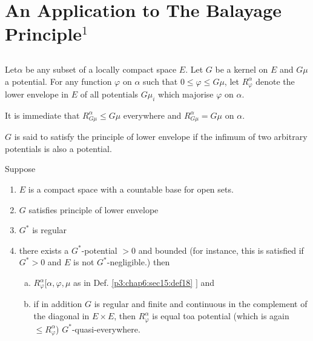 \chapter{An Application to The Balayage
  Principle\texorpdfstring{${}^1$}{1}}\label{p3:chap6} %

\setcounter{section}{14}
\section{}\label{p3:chap6:sec15} %

\begin{defn}\label{p3:chap6:sec15:def18}%
  Let\pageoriginale $\alpha$ be any subset of a locally compact space $E$. Let $G$
  be a kernel on $E$ and $G \mu $ a potential. For any function
  $\varphi$ on $\alpha$  such that  $ 0 \leq \varphi \leq G \mu $, let
  $ R^\alpha_{\varphi} $ denote the lower envelope in $E$ of all
  potentials $ G \mu_i $ which majorise $\varphi$ on $\alpha$. 
\end{defn}

It is immediate that $R^\alpha_{G \mu} \leq G \mu$ everywhere and
$R^\alpha_{G \mu} = G \mu $ on $\alpha$. 

\begin{defn}\label{p3:chap6:sec15:def19} %
  $G$ is  said to satisfy the principle of lower envelope if  the
  infimum of two arbitrary potentials  is also a potential.  
\end{defn}

\begin{thm}\label{p3:chap6:sec15:thm14} %
  Suppose
  \begin{enumerate}[\rm (i)]
  \item $E$ is a  compact space with a countable base for open sets.
  \item $G$ satisfies principle of lower envelope
  \item $G^*$ is regular 
  \item there exists a $G^*$-potential $ > 0 $ and bounded (for
    instance, this is satisfied if $G^* >0$ and $E$ is not
    $G^*$-negligible.) then 
    \begin{enumerate}[a)]
    \item $ R^\alpha_\varphi \big [ \alpha, \varphi, \mu $ as  in
      Def. \ref{p3:chap6:sec15:def18} $\big ] $ and  
    \item if in addition $G$ is regular and finite and continuous in
      the complement of the diagonal in $ E \times E $, then $
      R^\alpha_\varphi $ is equal to\pageoriginale a potential (which is again $
      \leq R^\alpha_\varphi$) $G^*$-quasi-everywhere. 
    \end{enumerate}
  \end{enumerate} 
\end{thm}

